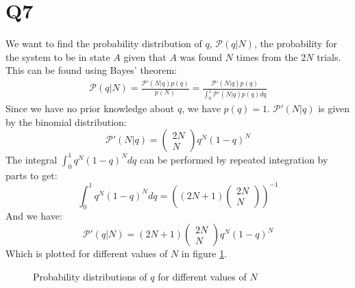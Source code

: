 \documentclass[12pt]{article}
\begin{document}
\section*{Q7}
We want to find the probability distribution of $q$, $\mathcal{P}(q|N)$, the probability for the system to be in state $A$ given that $A$ was found $N$ times from the $2N$ trials.
This can be found using Bayes' theorem:
\begin{align}
	\mathcal{P}(q|N) = \frac{\mathcal{P}'(N|q)p(q)}{p(N)} = \frac{\mathcal{P}'(N|q)p(q)}{\int_0^1\mathcal{P}'(N|q)p(q)dq}
\end{align}
Since we have no prior knowledge about $q$, we have $p(q)=1$. $\mathcal{P}'(N|q)$ is given by the binomial distribution: 
\begin{equation}
	\mathcal{P}'(N|q)=\left(\begin{matrix}2N\\N\end{matrix}\right)q^N(1-q)^N
\end{equation}
The integral $\int_0^1q^N(1-q)^Ndq$ can be performed by repeated integration by parts to get:
\begin{equation}
	\int_0^1q^N(1-q)^Ndq = \left((2N+1)\left(\begin{matrix}2N\\N\end{matrix}\right)\right)^{-1}
\end{equation}
And we have:
\begin{equation}
	\mathcal{P}'(q|N) = (2N+1)\left(\begin{matrix}2N\\N\end{matrix}\right)q^N(1-q)^N
\end{equation}
Which is plotted for different values of $N$ in figure \ref{fig:bayes_prob_dists}.
\begin{figure}
\centering
\subfloat{
}\qquad
\caption{Probability distributions of $q$ for different values of $N$}
\label{fig:bayes_prob_dists}
\end{figure}
\end{document}
